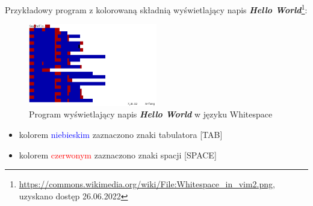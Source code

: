 \documentclass[fleqn,10pt]{SelfArx} %
\begin{document}
Przykładowy program z kolorowaną składnią wyświetlający napis \textbf{\textit{Hello World}}\footnote{\url{https://commons.wikimedia.org/wiki/File:Whitespace_in_vim2.png}, uzyskano dostęp 26.06.2022}:
\begin{figure}[H] %
	\centering %
	\includegraphics[width=0.5\textwidth]{Figures/whitespace.png} %
	\caption{Program wyświetlający napis \textbf{\textit{Hello World}} w języku Whitespace}
\end{figure}
\begin{itemize}
	\item kolorem \textcolor{blue}{niebieskim} zaznaczono znaki tabulatora [TAB]
	\item kolorem \textcolor{red}{czerwonym} zaznaczono znaki spacji [SPACE]
\end{itemize}
\end{document}
